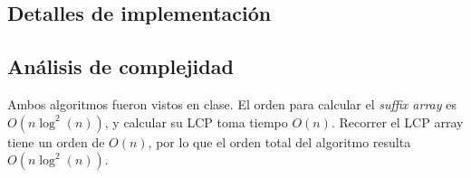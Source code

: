 \subsection*{Detalles de implementación}

\subsection*{Análisis de complejidad}

Ambos algoritmos fueron vistos en clase. El orden para calcular el {\sl suffix
array} es $O(n\log^2(n))$, y calcular su LCP toma tiempo $O(n)$. Recorrer el
LCP array tiene un orden de $O(n)$, por lo que el orden total del algoritmo
resulta $O(n\log^2(n))$.
